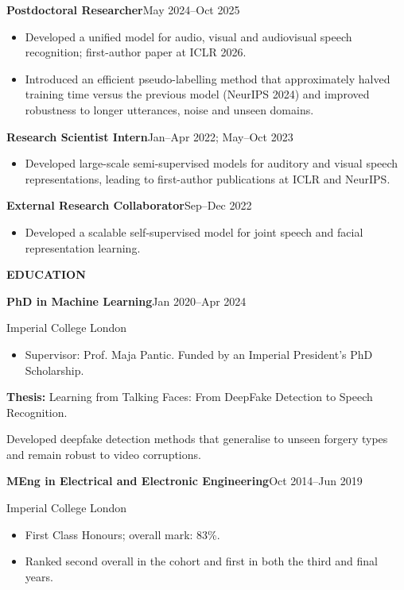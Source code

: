 \documentclass[10pt,a4paper]{article}
\newcommand{\cvsection}[1]{%
  \par\addvspace{14pt}%
  {\color{navy}\fontsize{10.5}{13}\selectfont\bfseries\MakeUppercase{#1}\par}%
  \nobreak\vspace{3pt}{\color{rule}\hrule height 0.45pt}%
  \nobreak\vspace{8pt}}
\newcommand{\dated}[2]{%
  {\bfseries #1}\hfill{\fontsize{9.5}{12}\selectfont\color{muted}#2}\par\nobreak}
\newcommand{\appointment}[2]{\dated{#1}{#2}}
\newcommand{\entrygap}{\par\vspace{7pt}}
\begin{document}
\appointment{Postdoctoral Researcher}{May 2024--Oct 2025}
\begin{itemize}
  \item Developed a unified model for audio, visual and audiovisual speech recognition; first-author paper at ICLR 2026.
  \item Introduced an efficient pseudo-labelling method that approximately halved training time versus the previous model (NeurIPS 2024) and improved robustness to longer utterances, noise and unseen domains.
\end{itemize}
\vspace{4pt}
\appointment{Research Scientist Intern}{Jan--Apr 2022; May--Oct 2023}
\begin{itemize}
  \item Developed large-scale semi-supervised models for auditory and visual speech representations, leading to first-author publications at ICLR and NeurIPS.
\end{itemize}
\vspace{4pt}
\appointment{External Research Collaborator}{Sep--Dec 2022}
\begin{itemize}
  \item Developed a scalable self-supervised model for joint speech and facial representation learning.
\end{itemize}
\entrygap
\cvsection{Education}
\dated{PhD in Machine Learning}{Jan 2020--Apr 2024}
Imperial College London\par
\begin{itemize}
  \item Supervisor: Prof. Maja Pantic. Funded by an Imperial President's PhD Scholarship.
\end{itemize}
\textbf{Thesis:} Learning from Talking Faces: From DeepFake Detection to Speech Recognition.\par
\vspace{2pt}
Developed deepfake detection methods that generalise to unseen forgery types and remain robust to video corruptions.\par
\entrygap
\dated{MEng in Electrical and Electronic Engineering}{Oct 2014--Jun 2019}
Imperial College London\par
\begin{itemize}
  \item First Class Honours; overall mark: 83\%.
  \item Ranked second overall in the cohort and first in both the third and final years.
\end{itemize}
\end{document}
